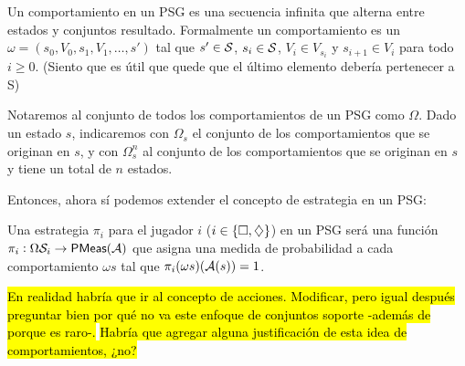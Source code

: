 \begin{definition}
	Un comportamiento en un PSG es una secuencia infinita que alterna entre estados y conjuntos resultado. Formalmente un comportamiento es un $\omega = (s_0, V_0, s_1, V_1, \dots, s')$ tal que $s' \in \mathcal{S}$, $s_i \in \mathcal{S}$, $V_i \in V_{s_i}$ y $s_{i+1} \in V_i$ para todo $i \geq 0$. (Siento que es útil que quede que el último elemento debería pertenecer a S)

	Notaremos al conjunto de todos los comportamientos de un PSG como $\Omega$.
	Dado un estado $s$, indicaremos con $\Omega_s$ el conjunto de los
	comportamientos que se originan en $s$, y con $\Omega_s^n$ al conjunto de los
	comportamientos que se originan en $s$ y tiene un total de $n$ estados.
\end{definition}

Entonces, ahora sí podemos extender el concepto de estrategia en un PSG:

\begin{definition}
	Una estrategia $\pi_i$ para el jugador $i$ ($i \in \{\square, \diamondsuit\}$) en un PSG será una función $\pi_i : \Omega \mathcal{S}_i \rightarrow \textsf{PMeas}(\mathcal{A})$ que asigna una medida de probabilidad a cada comportamiento $\omega s$ tal que $\pi_i(\omega s)(\mathcal{A}(s)) = 1$.
\end{definition}

\hl{En realidad habría que ir al concepto de acciones. Modificar, pero igual después preguntar bien por qué no va este enfoque de conjuntos soporte -además de porque es raro-.}
\hl{Habría que agregar alguna justificación de esta idea de comportamientos, ¿no?}

